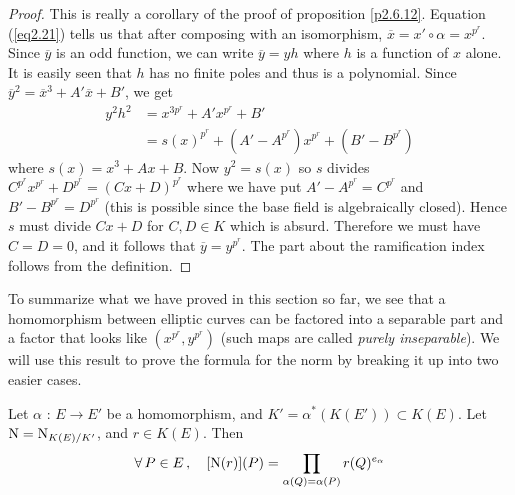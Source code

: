 \begin{proof}
This is really a corollary of the proof of proposition \ref{p2.6.12}. Equation (\ref{eq2.21}) tells us that after composing with an isomorphism, $\overline{x}=x'\circ\alpha =x^{p^{r}}$. Since $\overline{y}$ is an odd function, we can write $\overline{y}=yh$ where $h$ is a function of $x$ alone. It is easily seen that $h$ has no finite poles and thus is a polynomial. Since $\overline{y}^{2}=\overline{x}^{3}+A'\overline{x}+B'$, we get
\begin{align*}
y^{2}h^{2}&=x^{3p^{r}}+A'x^{p^{r}}+B'\\
&=s(x)^{p^{r}}+\left(A'-A^{p^{r}}\right) x^{p^{r}}+\left(B'-B^{p^{r}}\right)
\end{align*}
where $s(x)=x^{3}+Ax+B$. Now $y^{2}=s(x)$ so $s$ divides $C^{p^{r}}x^{p^{r}}+D^{p^{r}}=(Cx+D)^{p^{r}}$ where we have put $A'-A^{p^{r}}=C^{p^{r}}$ and $B'-B^{p^{r}}=D^{p^{r}}$ (this is possible since the base field is algebraically closed). Hence $s$ must divide $Cx+D$ for $C,D\in K$ which is absurd. Therefore we must have $C=D=0$, and it follows that $\overline{y}=y^{p^{r}}$. The part about the ramification index follows from the definition.
\end{proof}
To summarize what we have proved in this section so far, we see that a homomorphism between elliptic curves can be factored into a separable part and a factor that looks like $\left(x^{p^{r}}, y^{p^{r}}\right)$ (such maps are called {\it purely inseparable}). We will use this result to prove the formula for the norm by breaking it up into two easier cases.

\begin{theo}
\label{t2.6.8}
Let $\alpha$ : $E\rightarrow E'$ be a homomorphism, and $K'=\alpha^{*}(K(E')) \subset K(E)$. Let $\operatorname{N}=\operatorname{N}_{K(E)/K'}$, and $r\in K(E)$. Then
$$
\forall \, P \in E\,,\quad [\operatorname{N}(r)](P)=\prod_{\alpha(Q)=\alpha(P)}r(Q)^{e_{\alpha}}
$$
\end{theo}

